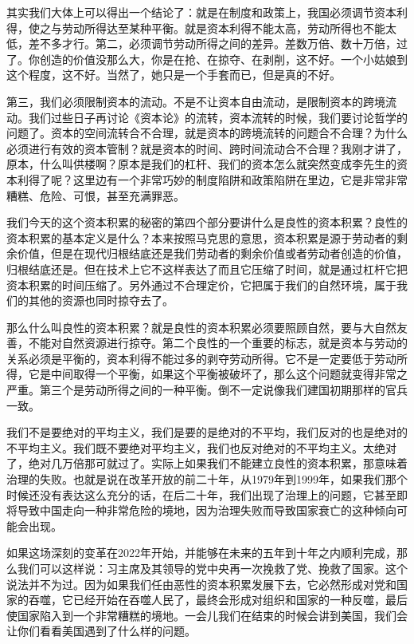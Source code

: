 \documentclass[UTF8, 12pt, a4paper]{ctexrep}
\begin{document}
其实我们大体上可以得出一个结论了：就是在制度和政策上，我国必须调节资本利得，使之与劳动所得达至某种平衡。就是资本利得不能太高，劳动所得也不能太低，差不多才行。第二，必须调节劳动所得之间的差异。差数万倍、数十万倍，过了。你创造的价值没那么大，你是在抢、在掠夺、在剥削，这不好。一个小姑娘到这个程度，这不好。当然了，她只是一个手套而已，但是真的不好。

第三，我们必须限制资本的流动。不是不让资本自由流动，是限制资本的跨境流动。我们过些日子再讨论《资本论》的流转，资本流转的时候，我们要讨论哲学的问题了。资本的空间流转合不合理，就是资本的跨境流转的问题合不合理？为什么必须进行有效的资本管制？就是资本的时间、跨时间流动合不合理？我刚才讲了，原本，什么叫供楼啊？原本是我们的杠杆、我们的资本怎么就突然变成李先生的资本利得了呢？这里边有一个非常巧妙的制度陷阱和政策陷阱在里边，它是非常非常糟糕、危险、可恨，甚至充满罪恶。

我们今天的这个资本积累的秘密的第四个部分要讲什么是良性的资本积累？良性的资本积累的基本定义是什么？本来按照马克思的意思，资本积累是源于劳动者的剩余价值，但是在现代归根结底还是我们劳动者的剩余价值或者劳动者创造的价值，归根结底还是。但在技术上它不这样表达了而且它压缩了时间，就是通过杠杆它把资本积累的时间压缩了。另外通过不合理定价，它把属于我们的自然环境，属于我们的其他的资源也同时掠夺去了。

那么什么叫良性的资本积累？就是良性的资本积累必须要照顾自然，要与大自然友善，不能对自然资源进行掠夺。第二个良性的一个重要的标志，就是资本与劳动的关系必须是平衡的，资本利得不能过多的剥夺劳动所得。它不是一定要低于劳动所得，它是中间取得一个平衡，如果这个平衡被破坏了，那么这个问题就变得非常之严重。第三个是劳动所得之间的一种平衡。倒不一定说像我们建国初期那样的官兵一致。

我们不是要绝对的平均主义，我们是要的是绝对的不平均，我们反对的也是绝对的不平均主义。我们既不要绝对平均主义，我们也反对绝对的不平均主义。太绝对了，绝对几万倍那可就过了。实际上如果我们不能建立良性的资本积累，那意味着治理的失败。也就是说在改革开放的前二十年，从1979年到1999年，如果我们那个时候还没有表达这么充分的话，在后二十年，我们出现了治理上的问题，它甚至即将导致中国走向一种非常危险的境地，因为治理失败而导致国家衰亡的这种倾向可能会出现。

如果这场深刻的变革在2022年开始，并能够在未来的五年到十年之内顺利完成，那么我们可以这样说：习主席及其领导的党中央再一次挽救了党、挽救了国家。这个说法并不为过。因为如果我们任由恶性的资本积累发展下去，它必然形成对党和国家的吞噬，它已经开始在吞噬人民了，最终会形成对组织和国家的一种反噬，最后使国家陷入到一个非常糟糕的境地。一会儿我们在结束的时候会讲到美国，我们会让你们看看美国遇到了什么样的问题。
\end{document}
